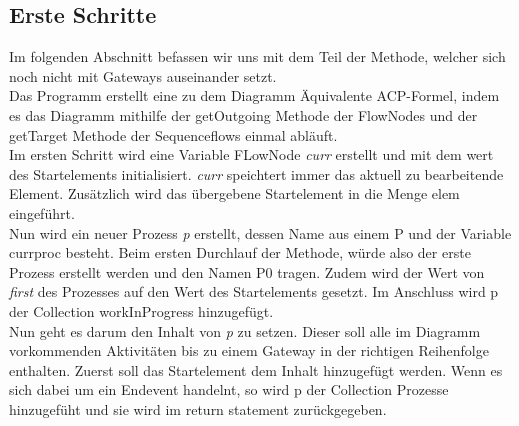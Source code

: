 \subsection{Erste Schritte}
Im folgenden Abschnitt befassen wir uns mit dem Teil der Methode, welcher sich noch nicht mit Gateways auseinander setzt.\\
Das Programm erstellt eine zu dem Diagramm Äquivalente ACP-Formel, indem es das Diagramm mithilfe der getOutgoing Methode der FlowNodes und der getTarget Methode der Sequenceflows einmal abläuft.\\
Im ersten Schritt wird eine Variable FLowNode \textit{curr} erstellt und mit dem wert des Startelements initialisiert. \textit{curr} speichtert immer das aktuell zu bearbeitende Element. Zusätzlich wird das übergebene Startelement in die Menge elem eingeführt.\\
Nun wird ein neuer Prozess \textit{p} erstellt, dessen Name aus einem P und der Variable currproc besteht. Beim ersten Durchlauf der Methode, würde also der erste Prozess erstellt werden und den Namen P0 tragen. Zudem wird der Wert von \textit{first} des Prozesses auf den Wert des Startelements gesetzt. Im Anschluss wird p der Collection workInProgress hinzugefügt.\\
Nun geht es darum den Inhalt von \textit{p} zu setzen. Dieser soll alle im Diagramm vorkommenden Aktivitäten bis zu einem Gateway in der richtigen Reihenfolge enthalten.
Zuerst soll das Startelement dem Inhalt hinzugefügt werden. Wenn es sich dabei um ein Endevent handelnt, so wird p der Collection Prozesse hinzugefüht und sie wird im return statement zurückgegeben.\\

